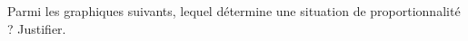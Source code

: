 
\begin{exercice}\label{exo2smath-0021}

    Parmi les graphiques suivants, lequel détermine une situation de proportionnalité ? Justifier.

    \begin{center}
\hfill
\hfill

    \end{center}

\end{exercice}
